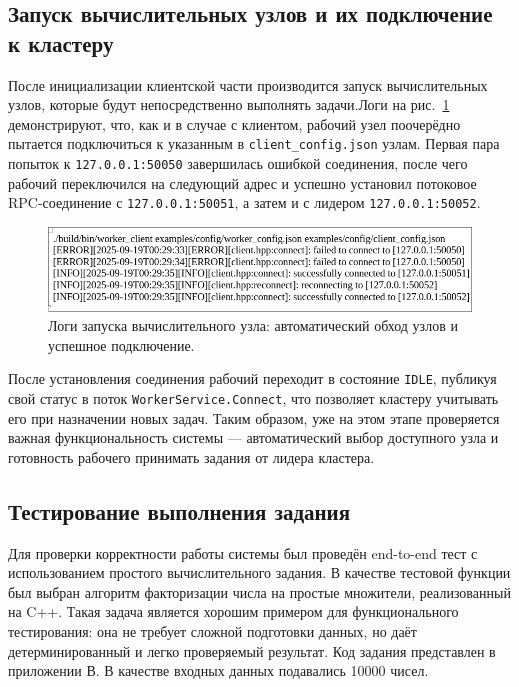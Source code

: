 \subsection{Запуск вычислительных узлов и их подключение к кластеру}

После инициализации клиентской части производится запуск вычислительных узлов,
которые будут непосредственно выполнять задачи.Логи на
рис.~\ref{fig:worker_start} демонстрируют, что, как и в случае с клиентом,
рабочий узел поочерёдно пытается подключиться к указанным в
\texttt{client\_config.json} узлам. Первая пара попыток к
\texttt{127.0.0.1:50050} завершилась ошибкой соединения, после чего рабочий
переключился на следующий адрес и успешно установил потоковое RPC-соединение с
\texttt{127.0.0.1:50051}, а затем и с лидером \texttt{127.0.0.1:50052}.

\begin{figure}[h!]
    \centering
    \includegraphics[width=0.8\linewidth]{inc/worker-log.png}
    \caption{Логи запуска вычислительного узла: автоматический обход узлов и успешное подключение.}
    \label{fig:worker_start}
\end{figure}

После установления соединения рабочий переходит в состояние \texttt{IDLE},
публикуя свой статус в поток \texttt{WorkerService.Connect}, что позволяет
кластеру учитывать его при назначении новых задач. Таким образом, уже на этом
этапе проверяется важная функциональность системы — автоматический выбор
доступного узла и готовность рабочего принимать задания от лидера кластера.

\subsection{Тестирование выполнения задания}

Для проверки корректности работы системы был проведён end-to-end тест с
использованием простого вычислительного задания. В качестве тестовой функции
был выбран алгоритм факторизации числа на простые множители, реализованный на
C++. Такая задача является хорошим примером для функционального тестирования:
она не требует сложной подготовки данных, но даёт детерминированный и легко
проверяемый результат. Код задания представлен в приложении В. В качестве
входных данных подавались 10000 чисел.

